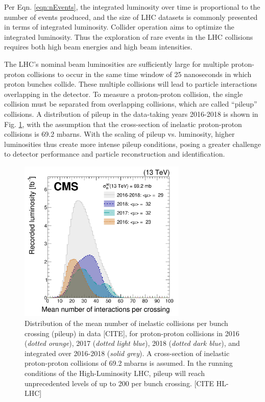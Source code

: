 \documentclass{article}
\begin{document}
Per Eqn. \ref{eqn:nEvents}, the integrated luminosity over time is proportional to the number of events produced, and the size of LHC datasets is commonly presented in terms of integrated luminosity. Collider operation aims to optimize the integrated luminosity. Thus the exploration of rare events in the LHC collisions requires both high beam energies and high beam intensities.

The LHC's nominal beam luminosities are sufficiently large for multiple proton-proton collisions to occur in the same time window of 25 nanoseconds in which proton bunches collide. These multiple collisions will lead to particle interactions overlapping in the detector. To measure a proton-proton collision, the single collision must be separated from overlapping collisions, which are called ``pileup'' collisions. A distribution of pileup in the data-taking years 2016-2018 is shown in Fig. \ref{fig:pileup-run-2}, with the assumption that the cross-section of inelastic proton-proton collisions is 69.2 mbarns. With the scaling of pileup vs. luminosity, higher luminosities thus create more intense pileup conditions, posing a greater challenge to detector performance and particle reconstruction and identification.

\begin{figure}[ht]
    \centering
    \includegraphics[width=8cm]{figures/pileup-run-2-CMS-JME-18-001_Figure_001.png}
    \caption{Distribution of the mean number of inelastic collisions per bunch crossing (pileup) in data [CITE], for proton-proton collisions in 2016 (\textit{dotted orange}), 2017 (\textit{dotted light blue}), 2018 (\textit{dotted dark blue}), and integrated over 2016-2018 (\textit{solid grey}). A cross-section of inelastic proton-proton collisions of 69.2 mbarns is assumed. In the running conditions of the High-Luminosity LHC, pileup will reach unprecedented levels of up to 200 per bunch crossing. [CITE HL-LHC]}
    \label{fig:pileup-run-2}
\end{figure}
\end{document}
